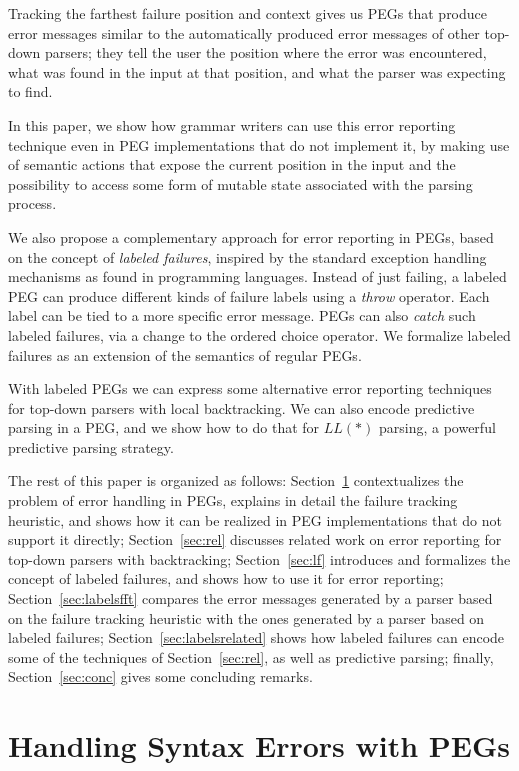\documentclass[3p,12pt,singlecolumn]{elsarticle}
\begin{document}
Tracking the farthest failure position and context
gives us PEGs that produce error messages
similar to the automatically produced error
messages of other top-down parsers; they tell
the user the position where the error was encountered,
what was found in the input at that position,
and what the parser was expecting to find.

In this paper, we show how grammar writers can use
this error reporting technique even in PEG implementations
that do not implement it, by making use of semantic
actions that expose the current position in the input
and the possibility to access some form of mutable state
associated with the parsing process. 

We also propose a complementary approach for error
reporting in PEGs, based on the concept of \emph{labeled
failures}, inspired by the standard exception handling
mechanisms as found in programming languages. Instead of just
failing, a labeled PEG can produce different kinds of failure
labels using a {\em throw} operator. Each label can be
tied to a more specific error message. PEGs can also
{\em catch} such labeled failures, via a change to
the ordered choice operator. We formalize labeled
failures as an extension of the semantics of regular
PEGs.

With labeled PEGs we can express some alternative error
reporting techniques for top-down parsers with local
backtracking. We can also encode
predictive parsing in a PEG, and we show
how to do that for $LL(*)$ parsing, a powerful predictive
parsing strategy.

The rest of this paper is organized as follows:
Section~\ref{sec:pegs} contextualizes the problem of error
handling in PEGs, explains in detail the failure tracking
heuristic, and shows how it can be realized in PEG implementations
that do not support it directly; Section~\ref{sec:rel}
discusses related work on error reporting for top-down
parsers with backtracking;
Section~\ref{sec:lf}
introduces and formalizes the concept of labeled failures,
and shows how to use it for error reporting;
Section~\ref{sec:labelsfft} compares the error messages
generated by a parser based on the failure tracking heuristic  
with the ones generated by a parser based on labeled failures;
Section~\ref{sec:labelsrelated} shows how labeled failures
can encode some of the techniques of Section~\ref{sec:rel},
as well as predictive parsing;
finally, Section~\ref{sec:conc} gives some concluding
remarks.

\section{Handling Syntax Errors with PEGs} 
\label{sec:pegs}
\end{document}
